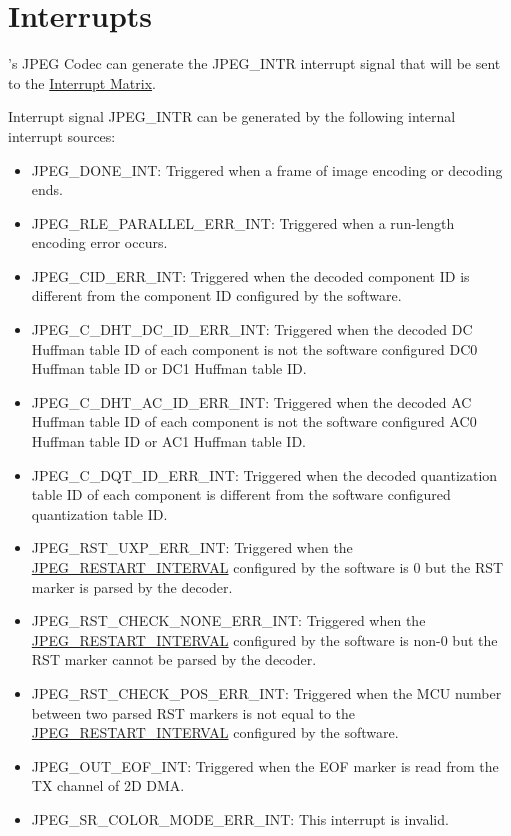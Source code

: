 \documentclass[main\_\_EN.tex]{subfiles}
\begin{document}

\section{Interrupts}

\chipname{}'s JPEG Codec can generate the JPEG\_INTR interrupt signal that will be sent to the \hyperref[mod:intmtrx]{Interrupt Matrix}.

Interrupt signal JPEG\_INTR can be generated by the following internal interrupt sources:
\begin{itemize}
\item JPEG\_DONE\_INT: Triggered when a frame of image encoding or decoding ends.
\item JPEG\_RLE\_PARALLEL\_ERR\_INT: Triggered when a run-length encoding error occurs.
\item JPEG\_CID\_ERR\_INT: Triggered when the decoded component ID is different from the component ID configured by the software.
\item JPEG\_C\_DHT\_DC\_ID\_ERR\_INT: Triggered when the decoded DC Huffman table ID of each component is not the software configured DC0 Huffman table ID or DC1 Huffman table ID.
\item JPEG\_C\_DHT\_AC\_ID\_ERR\_INT: Triggered when the decoded AC Huffman table ID of each component is not the software configured AC0 Huffman table ID or AC1 Huffman table ID.
\item JPEG\_C\_DQT\_ID\_ERR\_INT: Triggered when the decoded quantization table ID of each component is different from the software configured quantization table ID.
\item JPEG\_RST\_UXP\_ERR\_INT: Triggered when the \hyperref[fielddesc:JPEGRESTARTINTERVAL]{JPEG\_RESTART\_INTERVAL} configured by the software is 0 but the RST marker is parsed by the decoder.
\item JPEG\_RST\_CHECK\_NONE\_ERR\_INT: Triggered when the \hyperref[fielddesc:JPEGRESTARTINTERVAL]{JPEG\_RESTART\_INTERVAL} configured by the software is non-0 but the RST marker cannot be parsed by the decoder.
\item JPEG\_RST\_CHECK\_POS\_ERR\_INT: Triggered when the MCU number between two parsed RST markers is not equal to the \hyperref[fielddesc:JPEGRESTARTINTERVAL]{JPEG\_RESTART\_INTERVAL} configured by the software.
\item JPEG\_OUT\_EOF\_INT: Triggered when the EOF marker is read from the TX channel of 2D DMA.
\item JPEG\_SR\_COLOR\_MODE\_ERR\_INT: This interrupt is invalid.

\end{itemize}
\end{document}
